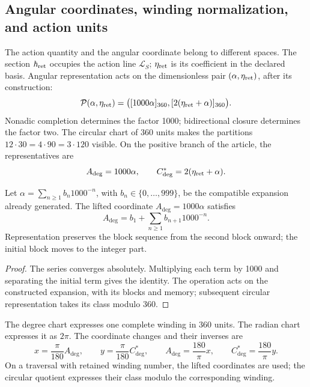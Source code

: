 \begingroup\fontsize{10}{12.1}\selectfont
\setlength{\parskip}{1.5pt}\setlength{\abovedisplayskip}{4pt}\setlength{\belowdisplayskip}{4pt}
\subsection{Angular coordinates, winding normalization, and action units}
\label{sec:ii-angulos}

The action quantity and the angular coordinate belong to different
spaces. The section \(\hbar_{\rm ret}\) occupies the action line
\(\mathcal L_S\); \(\eta_{\rm ret}\) is its coefficient in the
declared basis. Angular representation acts on the dimensionless pair
\((\alpha,\eta_{\rm ret})\), after its construction:
\begin{equation}
 \mathcal P(\alpha,\eta_{\rm ret})
 =\bigl([1000\alpha]_{360},[2(\eta_{\rm ret}+\alpha)]_{360}\bigr).
 \label{eq:ii-par-angular}
\end{equation}
Nonadic completion determines the factor 1000; bidirectional
closure determines the factor two. The circular chart of 360
units makes the partitions
\(12\cdot30=4\cdot90=3\cdot120\) visible. On the positive branch of
the article, the representatives are
\[
 A_{\deg}=1000\alpha,\qquad
 C^*_{\deg}=2(\eta_{\rm ret}+\alpha).
\]

\begin{proposition}
\label{prop:ii-desplazamiento-angular}
Let \(\alpha=\sum_{n\geq1}b_n1000^{-n}\), with
\(b_n\in\{0,\ldots,999\}\), be the compatible expansion already generated.
The lifted coordinate \(A_{\deg}=1000\alpha\) satisfies
\[
 A_{\deg}=b_1+\sum_{n\geq1}b_{n+1}1000^{-n}.
\]
Representation preserves the block sequence from the second block onward;
the initial block moves to the integer part.
\end{proposition}
\begin{proof}
The series converges absolutely. Multiplying each term by 1000
and separating the initial term gives the identity. The operation
acts on the constructed expansion, with its blocks and memory;
subsequent circular representation takes its class modulo 360.
\end{proof}

\begin{definition}
The degree chart expresses one complete winding in 360 units.
The radian chart expresses it as \(2\pi\). The coordinate
changes and their inverses are
\[
 x=\frac{\pi}{180}A_{\deg},\qquad
 y=\frac{\pi}{180}C^*_{\deg},\qquad
 A_{\deg}=\frac{180}{\pi}x,\qquad
 C^*_{\deg}=\frac{180}{\pi}y.
\]
On a traversal with retained winding number, the lifted
coordinates are used; the circular quotient expresses their class modulo
the corresponding winding.
\end{definition}

